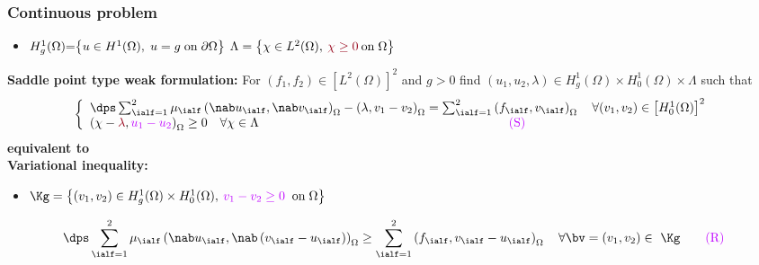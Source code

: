 \documentclass[aspectratio=169]{beamer}
\begin{document}
\begin{frame}
\frametitle{Continuous problem}
\begin{itemize}
\item $H_g^1(\Omega)\hspace{-0.1 cm} =\hspace{-0.1 cm} \left\{u\in H^1(\Omega), \hspace{0.1 cm} u=g \hspace{0.1 cm} \mbox{on} \hspace{0.1 cm} \partial \Omega\right\}$ \quad $\Lambda=\left\{\chi\in L^2(\Omega), \: \textcolor{carmine}{\chi \geq 0} \: \mbox{on} \hspace{0.1 cm} \Omega\right\}$
\end{itemize}
\textbf{Saddle point type weak formulation:}
For $(f_1,f_2)\in \left[L^2(\Omega)\right]^2$ and $g > 0$ find $(u_1,u_2,\lambda)\in H_g^1(\Omega)\times H_0^1(\Omega) \times \Lambda$ such that
\begin{equation*}
\left\lbrace\begin{array}{llccc}
\dps \sum_{\ialf=1}^2 \mu_\ialf \left(\nab u_\ialf,\nab v_\ialf\right)_{\Omega} - \left(\lambda,v_1-v_2\right)_{\Omega} = \sum_{\ialf=1}^2\left(f_\ialf,v_\ialf\right)_{\Omega} \quad \forall (v_1,v_2) \in \left[H_0^1(\Omega)\right]^2 \\
\left(\chi - \textcolor{carmine}{\lambda},\textcolor{electricpurple}{u_1-u_2}\right)_{\Omega} \geq 0 
\quad \forall \chi \in \Lambda \hspace{7 cm} \textcolor{electricpurple}{(\mathrm{S})}
\end{array}
\right.
\end{equation*}
\hspace{4.5 cm}\textcolor{cadmiumgreen}{\textbf{equivalent to}}\\
\textbf{Variational inequality:}
\begin{itemize}
\item $\Kg= \left\{(v_1,v_2)\in H_g^1(\Omega)\times H_0^1(\Omega),\: \textcolor{electricpurple}{v_1-v_2 \geq 0} \; \; \mbox{on} 
\hspace{0.1 cm} \Omega \right\}$
\end{itemize}

\begin{equation*}
\dps \sum_{\ialf=1}^2 \mu_\ialf \left(\nab u_\ialf,\nab \left(v_\ialf-u_\ialf\right)\right)_{\Omega} \geq \sum_{\ialf=1}^2\left(f_\ialf,v_\ialf-u_\ialf\right)_{\Omega} \quad \forall \bv = (v_1,v_2)\in ~\Kg \qquad \textcolor{electricpurple}{(\mathrm{R})}
\end{equation*}
\end{frame}
\end{document}
